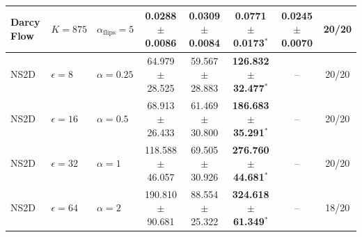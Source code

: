 \documentclass[letterpaper]{article} %
\begin{document}
\begin{table}[t]
\begin{tabular}{@{}lllccccc@{}}
Darcy Flow & $K=875$ & $\alpha_{\mathrm{flips}}=5$
& 0.0288 \(\pm\) 0.0086 & 0.0309 \(\pm\) 0.0084 & \textbf{0.0771 \(\pm\) 0.0173}\(^{*}\) & 0.0245 \(\pm\) 0.0070 & 20/20 \\
\midrule
NS2D & $\epsilon=8$ & $\alpha=0.25$
& 64.979 \(\pm\) 28.525 & 59.567 \(\pm\) 28.883 & \textbf{126.832 \(\pm\) 32.477}\(^{*}\) & -- & 20/20 \\
NS2D & $\epsilon=16$ & $\alpha=0.5$
& 68.913 \(\pm\) 26.433 & 61.469 \(\pm\) 30.800 & \textbf{186.683 \(\pm\) 35.291}\(^{*}\) & -- & 20/20 \\
NS2D & $\epsilon=32$ & $\alpha=1$
& 118.588 \(\pm\) 46.057 & 69.505 \(\pm\) 30.926 & \textbf{276.760 \(\pm\) 44.681}\(^{*}\) & -- & 20/20 \\
NS2D & $\epsilon=64$ & $\alpha=2$
& 190.810 \(\pm\) 90.681 & 88.554 \(\pm\) 25.322 & \textbf{324.618 \(\pm\) 61.349}\(^{*}\) & -- & 18/20 \\
\bottomrule
\end{tabular}%
\vspace{0.65em}


\end{table}
\end{document}
